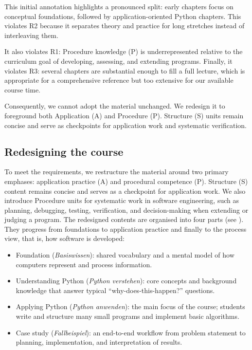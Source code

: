 \documentclass{article}
\begin{document}
This initial annotation highlights a pronounced split: early chapters focus on conceptual foundations, followed by application-oriented Python chapters. This violates R2 because it separates theory and practice for long stretches instead of interleaving them.\par
It also violates R1: Procedure knowledge (P) is underrepresented relative to the curriculum goal of developing, assessing, and extending programs. Finally, it violates R3: several chapters are substantial enough to fill a full lecture, which is appropriate for a comprehensive reference but too extensive for our available course time.\par
Consequently, we cannot adopt the material unchanged. We redesign it to foreground both Application (A) and Procedure (P). Structure (S) units remain concise and serve as checkpoints for application work and systematic verification.\par



\subsection{Redesigning the course}
To meet the requirements, we restructure the material around two primary emphases: application practice (A) and procedural competence (P). Structure (S) content remains concise and serves as a checkpoint for application work. We also introduce Procedure units for systematic work in software engineering, such as planning, debugging, testing, verification, and decision-making when extending or judging a program. The redesigned contents are organised into four parts (see ). They progress from foundations to application practice and finally to the process view, that is, how software is developed:
\begin{itemize}[leftmargin=*]
  \item Foundation (\emph{Basiswissen}): shared vocabulary and a mental model of how computers represent and process information.\vspace{-1mm}
  \item Understanding Python (\emph{Python verstehen}): core concepts and background knowledge that answer typical ``why-does-this-happen?'' questions.\vspace{-1mm}
  \item Applying Python (\emph{Python anwenden}): the main focus of the course; students write and structure many small programs and implement basic algorithms.\vspace{-1mm}
  \item Case study (\emph{Fallbeispiel}): an end-to-end workflow from problem statement to planning, implementation, and interpretation of results.\vspace{-1mm}
\end{itemize}
\vspace{-1mm}
\end{document}
